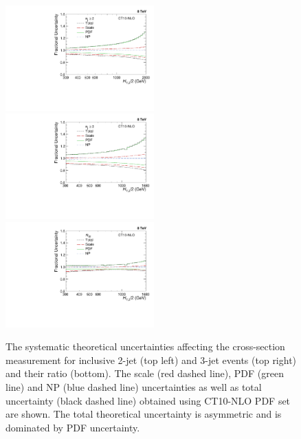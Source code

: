 \begin{figure}[!h]
 \begin{center}
 \hspace*{-5mm}\includegraphics[width=0.51\textwidth]{Plots_HT_2_150/Theory_Unc_2.pdf}%
 ~~\includegraphics[width=0.51\textwidth]{Plots_HT_2_150/Theory_Unc_3.pdf}\\
 \includegraphics[width=0.51\textwidth]{Plots_HT_2_150/Theory_Unc_Ratio_32.pdf}\\
 \caption[The systematic theoretical uncertainties affecting the cross-section measurement and the cross-section ratio.]{The systematic theoretical uncertainties affecting the cross-section measurement for inclusive 2-jet (top left) and 3-jet events (top right) and their ratio \ratio (bottom). The scale (red dashed line), PDF (green line) and NP (blue dashed line) uncertainties as well as total uncertainty (black dashed line) obtained using CT10-NLO PDF set are shown. The total theoretical uncertainty is asymmetric and is dominated by PDF uncertainty.}
 \label{fig:theory_unc}
 \end{center}
\end{figure}

